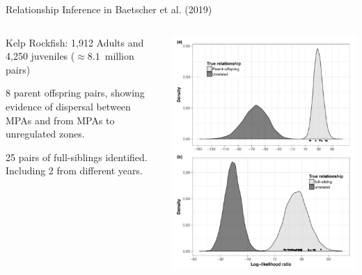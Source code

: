 \documentclass[letter,graphicx]{beamer}
\begin{document}
\begin{frame}{Relationship Inference in Baetscher et al. (2019)}
\begin{columns}
\begin{column}{0.5\textwidth}
\begin{itemize}
{\small
\item Kelp Rockfish: 1,912 Adults and 4,250 juveniles ($\approx 8.1$~million pairs)
\item 8 parent offspring pairs, showing evidence of dispersal between MPAs and from MPAs to unregulated zones.
\item 25 pairs of full-siblings identified. Including 2 from different years.
}
\end{itemize}
\end{column}
\begin{column}{0.5\textwidth}
\includegraphics[width = 1.0\textwidth]{images/rockfish-distros.pdf}
\end{column}
\end{columns}

\end{frame}
\end{document}
